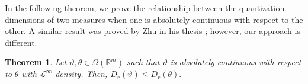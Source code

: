 \documentclass{amsproc}
\newtheorem{theorem}{Theorem}[section]
\theoremstyle{definition}
\theoremstyle{remark}
\numberwithin{equation}{section}
\begin{document}
    
In the following theorem, we prove the relationship between the quantization dimensions of two measures when one is absolutely continuous with respect to the other. A similar result was proved by Zhu in his thesis \cite{Zhu2}; however, our approach is different.
\begin{theorem}
Let $\vartheta, \theta \in \Omega(\mathbb{R}^m)$ such that $\vartheta$ is absolutely continuous with respect to $\theta$ with $\mathcal{L}^{\infty}$-density. Then, $ D_r(\vartheta) \le D_r(\theta).$
\end{theorem}
\end{document}
